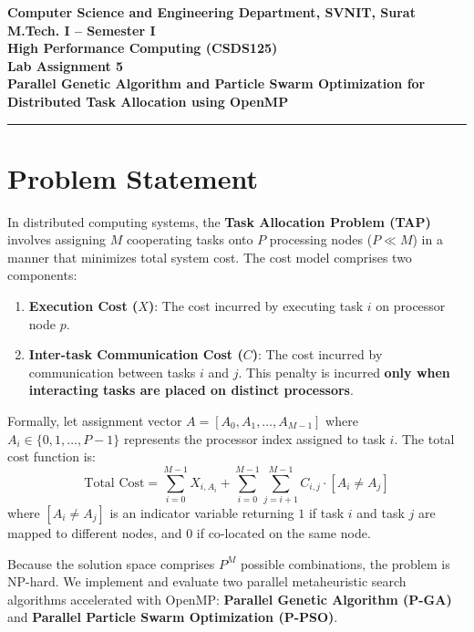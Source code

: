\documentclass[12pt]{article}
\begin{document}

\begin{center}
\textbf{Computer Science and Engineering Department, SVNIT, Surat}\\
\textbf{M.Tech. I -- Semester I}\\
\textbf{High Performance Computing (CSDS125)}\\
\textbf{Lab Assignment 5}\\
\textbf{Parallel Genetic Algorithm and Particle Swarm Optimization for Distributed Task Allocation using OpenMP}
\end{center}
\vspace{-4pt}
\hrule
\vspace{6pt}

\section{Problem Statement}
In distributed computing systems, the \textbf{Task Allocation Problem (TAP)} involves assigning $M$ cooperating tasks onto $P$ processing nodes ($P \ll M$) in a manner that minimizes total system cost. The cost model comprises two components:
\begin{enumerate}
    \item \textbf{Execution Cost ($X$)}: The cost incurred by executing task $i$ on processor node $p$.
    \item \textbf{Inter-task Communication Cost ($C$)}: The cost incurred by communication between tasks $i$ and $j$. This penalty is incurred \textbf{only when interacting tasks are placed on distinct processors}.
\end{enumerate}

Formally, let assignment vector $A = [A_0, A_1, \dots, A_{M-1}]$ where $A_i \in \{0, 1, \dots, P-1\}$ represents the processor index assigned to task $i$. The total cost function is:
\begin{equation}
\text{Total Cost} = \sum_{i=0}^{M-1} X_{i, A_i} + \sum_{i=0}^{M-1} \sum_{j=i+1}^{M-1} C_{i, j} \cdot \left[ A_i \neq A_j \right]
\end{equation}
where $[A_i \neq A_j]$ is an indicator variable returning $1$ if task $i$ and task $j$ are mapped to different nodes, and $0$ if co-located on the same node.

Because the solution space comprises $P^M$ possible combinations, the problem is NP-hard. We implement and evaluate two parallel metaheuristic search algorithms accelerated with OpenMP: \textbf{Parallel Genetic Algorithm (P-GA)} and \textbf{Parallel Particle Swarm Optimization (P-PSO)}.
\end{document}
